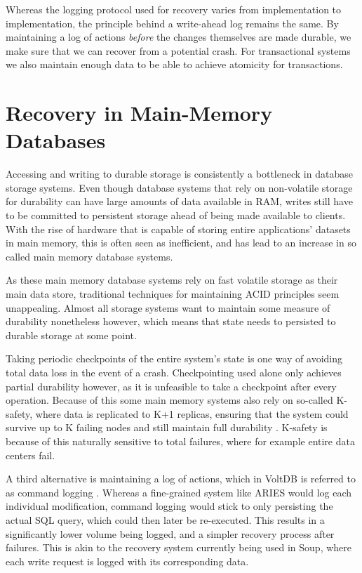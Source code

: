 \documentclass[b5paper]{report}
\begin{document}
Whereas the logging protocol used for recovery varies from implementation to
implementation, the principle behind a write-ahead log remains the same. By
maintaining a log of actions \textit{before} the changes themselves are made
durable, we make sure that we can recover from a potential crash. For
transactional systems we also maintain enough data to be able to achieve
atomicity for transactions.

\section{Recovery in Main-Memory Databases} \label{main-memory-recovery}
Accessing and writing to durable storage is consistently a bottleneck in
database storage systems. Even though database systems that rely on non-volatile
storage for durability can have large amounts of data available in RAM, writes
still have to be committed to persistent storage ahead of being made available
to clients. With the rise of hardware that is capable of storing entire
applications' datasets in main memory, this is often seen as inefficient,
and has lead to an increase in so called main memory database systems.

As these main memory database systems rely on fast volatile storage as their
main data store, traditional techniques for maintaining ACID principles seem
unappealing. Almost all storage systems want to maintain some measure of
durability nonetheless however, which means that state needs to persisted to
durable storage at some point.

Taking periodic checkpoints of the entire system's state is one way of avoiding
total data loss in the event of a crash. Checkpointing used alone only achieves
partial durability however, as it is unfeasible to take a checkpoint after every
operation. Because of this some main memory systems also rely on so-called
K-safety, where data is replicated to K+1 replicas, ensuring that the system
could survive up to K failing nodes and still maintain full durability
\cite{early-voltdb}. K-safety is because of this naturally sensitive to total
failures, where for example entire data centers fail.

A third alternative is maintaining a log of actions, which in VoltDB is referred
to as command logging \cite{voltdb-recovery}. Whereas a fine-grained system like
ARIES would log each individual modification, command logging would stick to
only persisting the actual SQL query, which could then later be re-executed.
This results in a significantly lower volume being logged, and a simpler
recovery process after failures. This is akin to the recovery system currently
being used in Soup, where each write request is logged with its corresponding
data.
\end{document}
